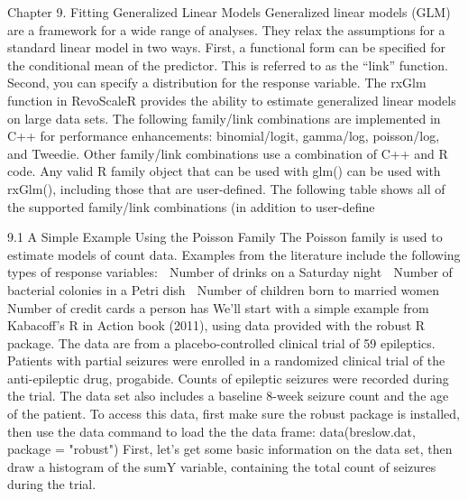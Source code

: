 Chapter 9.
Fitting Generalized Linear
Models
Generalized linear models (GLM) are a framework for a wide range of analyses. They relax the
assumptions for a standard linear model in two ways. First, a functional form can be specified
for the conditional mean of the predictor. This is referred to as the “link” function. Second,
you can specify a distribution for the response variable. The rxGlm function in RevoScaleR
provides the ability to estimate generalized linear models on large data sets.
The following family/link combinations are implemented in C++ for performance
enhancements: binomial/logit, gamma/log, poisson/log, and Tweedie. Other family/link
combinations use a combination of C++ and R code. Any valid R family object that can be used
with glm() can be used with rxGlm(), including those that are user-defined. The following table
shows all of the supported family/link combinations (in addition to user-define


9.1 A Simple Example Using the Poisson Family
The Poisson family is used to estimate models of count data. Examples from the literature
include the following types of response variables:
 Number of drinks on a Saturday night
 Number of bacterial colonies in a Petri dish
 Number of children born to married women
 Number of credit cards a person has
We’ll start with a simple example from Kabacoff’s R in Action book (2011), using data provided
with the robust R package. The data are from a placebo-controlled clinical trial of 59 epileptics.
Patients with partial seizures were enrolled in a randomized clinical trial of the anti-epileptic
drug, progabide. Counts of epileptic seizures were recorded during the trial. The data set also
includes a baseline 8-week seizure count and the age of the patient.
To access this data, first make sure the robust package is installed, then use the data command
to load the the data frame:
data(breslow.dat, package = "robust")
First, let’s get some basic information on the data set, then draw a histogram of the sumY
variable, containing the total count of seizures during the trial.

